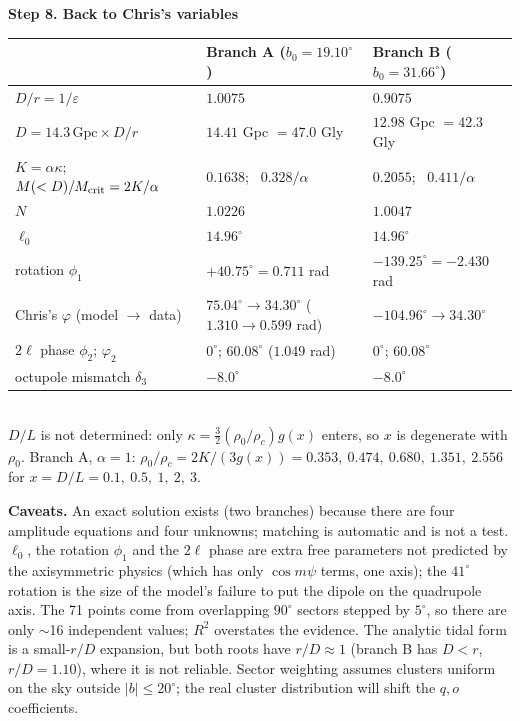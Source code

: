 \documentclass[11pt]{article}
\begin{document}
\medskip\textbf{Step 8. Back to Chris's variables}\\[2pt]
\begin{tabular}{l|l|l}
 & Branch A ($b_0=19.10^\circ$) & Branch B ($b_0=31.66^\circ$)\\\hline
$D/r=1/\varepsilon$ & $1.0075$ & $0.9075$\\
$D=14.3\,\text{Gpc}\times D/r$ & $14.41$ Gpc $=47.0$ Gly & $12.98$ Gpc $=42.3$ Gly\\
$K=\alpha\kappa$; \ $M(<D)/M_{\rm crit}=2K/\alpha$ & $0.1638$; \ $0.328/\alpha$ & $0.2055$; \ $0.411/\alpha$\\
$N$ & $1.0226$ & $1.0047$\\
$\ell_0$ & $14.96^\circ$ & $14.96^\circ$\\
rotation $\phi_1$ & $+40.75^\circ=0.711$ rad & $-139.25^\circ=-2.430$ rad\\
Chris's $\varphi$ (model $\to$ data) & $75.04^\circ\to34.30^\circ$ ($1.310\to0.599$ rad) & $-104.96^\circ\to34.30^\circ$\\
$2\ell$ phase $\phi_2$; $\varphi_2$ & $0^\circ$; $60.08^\circ$ ($1.049$ rad) & $0^\circ$; $60.08^\circ$\\
octupole mismatch $\delta_3$ & $-8.0^\circ$ & $-8.0^\circ$
\end{tabular}\\[3pt]
$D/L$ is not determined: only $\kappa=\tfrac32(\rho_0/\rho_c)g(x)$ enters, so $x$ is degenerate with $\rho_0$. Branch A, $\alpha=1$:
$\rho_0/\rho_c=2K/(3g(x))=0.353,\ 0.474,\ 0.680,\ 1.351,\ 2.556$ for $x=D/L=0.1,\ 0.5,\ 1,\ 2,\ 3$.

\medskip\textbf{Caveats.} An exact solution exists (two branches) because there are four amplitude equations and four unknowns; matching is automatic and is not a test.
$\ell_0$, the rotation $\phi_1$ and the $2\ell$ phase are extra free parameters not predicted by the axisymmetric physics (which has only $\cos m\psi$ terms, one axis);
the $41^\circ$ rotation is the size of the model's failure to put the dipole on the quadrupole axis. The 71 points come from overlapping $90^\circ$ sectors stepped by $5^\circ$,
so there are only $\sim$16 independent values; $R^2$ overstates the evidence. The analytic tidal form is a small-$r/D$ expansion, but both roots have $r/D\approx1$
(branch B has $D<r$, $r/D=1.10$), where it is not reliable. Sector weighting assumes clusters uniform on the sky outside $|b|\le20^\circ$; the real cluster distribution will shift the $q,o$ coefficients.
\end{document}
